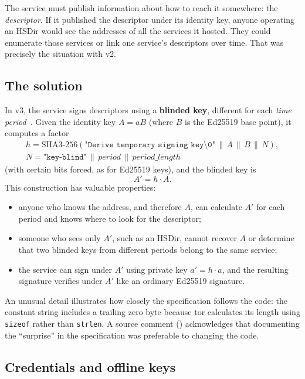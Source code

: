 The service must publish information about how to reach it somewhere: the \emph{descriptor}. If it published the descriptor under its identity key, anyone operating an HSDir would see the addresses of all the services it hosted. They could enumerate those services or link one service's descriptors over time. That was precisely the situation with v2.

\subsection{The solution}

In v3, the service signs descriptors using a \textbf{blinded key}, different for each \emph{time period}~. Given the identity key $A = aB$ (where $B$ is the Ed25519 base point), it computes a factor
\begin{gather*}
h = \mathrm{SHA3\text{-}256}(\texttt{"Derive temporary signing key\textbackslash 0"} \,\|\, A \,\|\, B \,\|\, N), \\
N = \texttt{"key-blind"} \,\|\, \mathit{period} \,\|\, \mathit{period\_length}
\end{gather*}
(with certain bits forced, as for Ed25519 keys), and the blinded key is
\[
A' = h \cdot A.
\]
This construction has valuable properties:
\begin{itemize}
  \item anyone who knows the address, and therefore $A$, can calculate $A'$ for each period and knows where to look for the descriptor;
  \item someone who sees only $A'$, such as an HSDir, cannot recover $A$ or determine that two blinded keys from different periods belong to the same service;
  \item the service can sign under $A'$ using private key $a' = h \cdot a$, and the resulting signature verifies under $A'$ like an ordinary Ed25519 signature.
\end{itemize}

An unusual detail illustrates how closely the specification follows the code: the constant string includes a trailing zero byte because tor calculates its length using \texttt{sizeof} rather than \texttt{strlen}. A source comment () acknowledges that documenting the \enquote{surprise} in the specification was preferable to changing the code.

\subsection{Credentials and offline keys}

